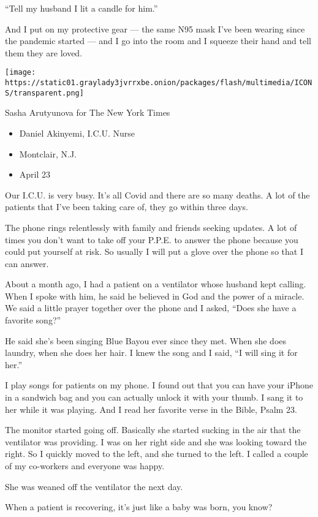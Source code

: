 ``Tell my husband I lit a candle for him.''

And I put on my protective gear --- the same N95 mask I've been wearing
since the pandemic started --- and I go into the room and I squeeze
their hand and tell them they are loved.

\texttt{[image: https://static01.graylady3jvrrxbe.onion/packages/flash/multimedia/ICONS/transparent.png]}

Sasha Arutyunova for The New York Times

\begin{itemize}
\tightlist
\item
  Daniel Akinyemi, I.C.U. Nurse
\item
  Montclair, N.J.
\item
  April 23
\end{itemize}

Our I.C.U. is very busy. It's all Covid and there are so many deaths. A
lot of the patients that I've been taking care of, they go within three
days.

The phone rings relentlessly with family and friends seeking updates. A
lot of times you don't want to take off your P.P.E. to answer the phone
because you could put yourself at risk. So usually I will put a glove
over the phone so that I can answer.

About a month ago, I had a patient on a ventilator whose husband kept
calling. When I spoke with him, he said he believed in God and the power
of a miracle. We said a little prayer together over the phone and I
asked, ``Does she have a favorite song?''

He said she's been singing Blue Bayou ever since they met. When she does
laundry, when she does her hair. I knew the song and I said, ``I will
sing it for her.''

I play songs for patients on my phone. I found out that you can have
your iPhone in a sandwich bag and you can actually unlock it with your
thumb. I sang it to her while it was playing. And I read her favorite
verse in the Bible, Psalm 23.

The monitor started going off. Basically she started sucking in the air
that the ventilator was providing. I was on her right side and she was
looking toward the right. So I quickly moved to the left, and she turned
to the left. I called a couple of my co-workers and everyone was happy.

She was weaned off the ventilator the next day.

When a patient is recovering, it's just like a baby was born, you know?

